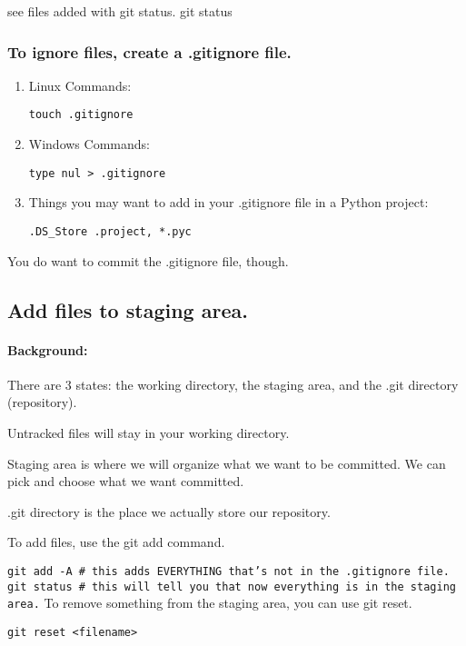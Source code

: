 see files added with git status. git status

\subsubsection{To ignore files, create a .gitignore
file.}\label{to-ignore-files-create-a-.gitignore-file.}

\begin{enumerate}
\def\labelenumi{\arabic{enumi}.}
\item
  Linux Commands:

  \texttt{touch .gitignore}
\item
  Windows Commands:

  \texttt{type nul \textgreater{} .gitignore}
\item
  Things you may want to add in your .gitignore file in a Python
  project:

  \texttt{.DS\_Store .project, *.pyc}
\end{enumerate}

You do want to commit the .gitignore file, though.

\subsection{Add files to staging
area.}\label{add-files-to-staging-area.}

\paragraph{Background:}\label{background}

There are 3 states: the working directory, the staging area, and the
.git directory (repository).

Untracked files will stay in your working directory.

Staging area is where we will organize what we want to be committed. We
can pick and choose what we want committed.

.git directory is the place we actually store our repository.

To add files, use the git add command.

\texttt{git add -A \# this adds EVERYTHING that's not in the .gitignore file.   git status \# this will tell you that now everything is in the staging area.}
To remove something from the staging area, you can use git reset.

\begin{verbatim}
git reset <filename>
\end{verbatim}

